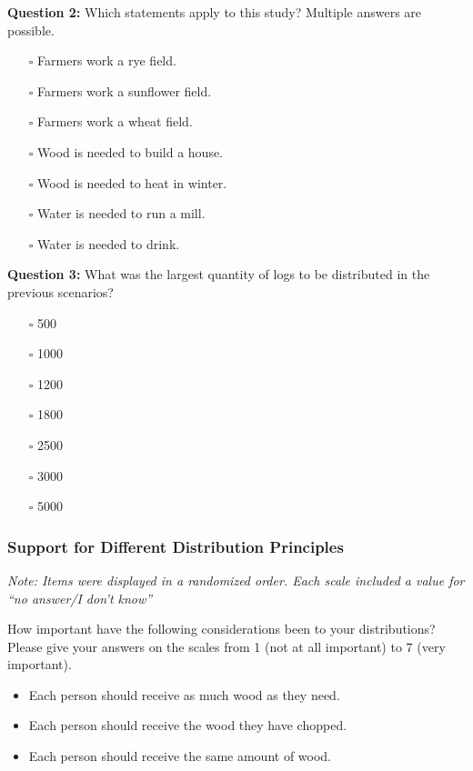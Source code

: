 \documentclass[egregdoesnotlikesansseriftitles]{scrartcl}
\begin{document}
\noindent\textbf{Question 2:} Which statements apply to this study?
Multiple answers are possible.
\begin{itemize}
   \item[$\square$] Farmers work a rye field.
   \item[$\square$] Farmers work a sunflower field.
   \item[$\square$] Farmers work a wheat field.
   \item[$\square$] Wood is needed to build a house.
   \item[$\square$] Wood is needed to heat in winter.
   \item[$\square$] Water is needed to run a mill.
   \item[$\square$] Water is needed to drink.
\end{itemize}\vspace{1ex}

\noindent\textbf{Question 3:} What was the largest quantity of logs to be distributed in the previous scenarios?
\begin{itemize}
   \item[$\square$] 500
   \item[$\square$] 1000
   \item[$\square$] 1200
   \item[$\square$] 1800
   \item[$\square$] 2500
   \item[$\square$] 3000
   \item[$\square$] 5000
\end{itemize}

\subsubsection*{Support for Different Distribution Principles}
\noindent\textit{Note: Items were displayed in a randomized order. Each scale included a value for ``no answer/I don't know''}\vspace{1ex}

\noindent How important have the following considerations been to your distributions?
Please give your answers on the scales from 1 (not at all important) to 7 (very important).
\begin{itemize}
   \item Each person should receive as much wood as they need.
   \item Each person should receive the wood they have chopped.
   \item Each person should receive the same amount of wood.
\end{itemize}
\end{document}
